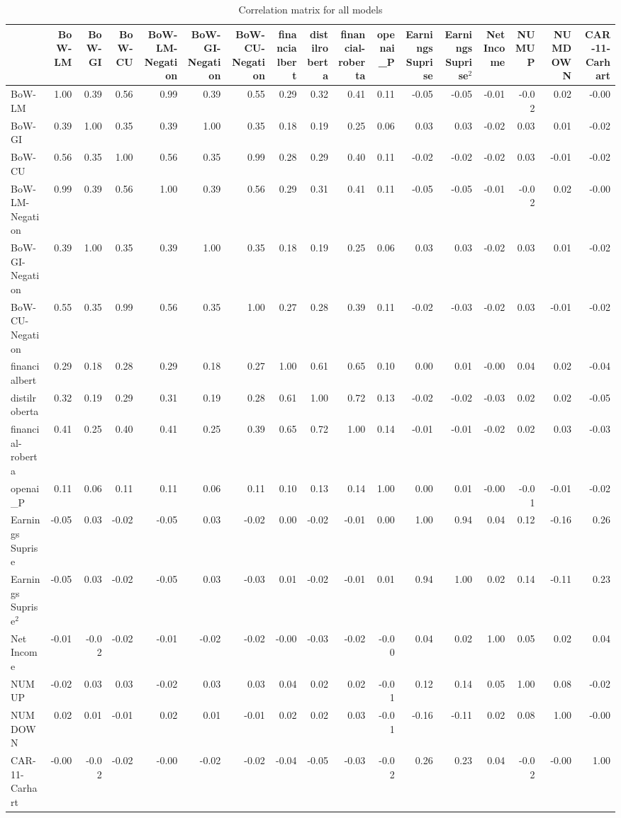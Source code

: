 \begin{table}
\caption{Correlation matrix for all models}
\label{tab:all_models_corr}
\begin{tabular}{lrrrrrrrrrrrrrrrr}
\toprule
 & BoW-LM & BoW-GI & BoW-CU & BoW-LM-Negation & BoW-GI-Negation & BoW-CU-Negation & financialbert & distilroberta & financial-roberta & openai_P & Earnings Suprise & Earnings Suprise$^2$ & Net Income & NUMUP & NUMDOWN & CAR-11-Carhart \\
\midrule
BoW-LM & 1.00 & 0.39 & 0.56 & 0.99 & 0.39 & 0.55 & 0.29 & 0.32 & 0.41 & 0.11 & -0.05 & -0.05 & -0.01 & -0.02 & 0.02 & -0.00 \\
BoW-GI & 0.39 & 1.00 & 0.35 & 0.39 & 1.00 & 0.35 & 0.18 & 0.19 & 0.25 & 0.06 & 0.03 & 0.03 & -0.02 & 0.03 & 0.01 & -0.02 \\
BoW-CU & 0.56 & 0.35 & 1.00 & 0.56 & 0.35 & 0.99 & 0.28 & 0.29 & 0.40 & 0.11 & -0.02 & -0.02 & -0.02 & 0.03 & -0.01 & -0.02 \\
BoW-LM-Negation & 0.99 & 0.39 & 0.56 & 1.00 & 0.39 & 0.56 & 0.29 & 0.31 & 0.41 & 0.11 & -0.05 & -0.05 & -0.01 & -0.02 & 0.02 & -0.00 \\
BoW-GI-Negation & 0.39 & 1.00 & 0.35 & 0.39 & 1.00 & 0.35 & 0.18 & 0.19 & 0.25 & 0.06 & 0.03 & 0.03 & -0.02 & 0.03 & 0.01 & -0.02 \\
BoW-CU-Negation & 0.55 & 0.35 & 0.99 & 0.56 & 0.35 & 1.00 & 0.27 & 0.28 & 0.39 & 0.11 & -0.02 & -0.03 & -0.02 & 0.03 & -0.01 & -0.02 \\
financialbert & 0.29 & 0.18 & 0.28 & 0.29 & 0.18 & 0.27 & 1.00 & 0.61 & 0.65 & 0.10 & 0.00 & 0.01 & -0.00 & 0.04 & 0.02 & -0.04 \\
distilroberta & 0.32 & 0.19 & 0.29 & 0.31 & 0.19 & 0.28 & 0.61 & 1.00 & 0.72 & 0.13 & -0.02 & -0.02 & -0.03 & 0.02 & 0.02 & -0.05 \\
financial-roberta & 0.41 & 0.25 & 0.40 & 0.41 & 0.25 & 0.39 & 0.65 & 0.72 & 1.00 & 0.14 & -0.01 & -0.01 & -0.02 & 0.02 & 0.03 & -0.03 \\
openai_P & 0.11 & 0.06 & 0.11 & 0.11 & 0.06 & 0.11 & 0.10 & 0.13 & 0.14 & 1.00 & 0.00 & 0.01 & -0.00 & -0.01 & -0.01 & -0.02 \\
Earnings Suprise & -0.05 & 0.03 & -0.02 & -0.05 & 0.03 & -0.02 & 0.00 & -0.02 & -0.01 & 0.00 & 1.00 & 0.94 & 0.04 & 0.12 & -0.16 & 0.26 \\
Earnings Suprise$^2$ & -0.05 & 0.03 & -0.02 & -0.05 & 0.03 & -0.03 & 0.01 & -0.02 & -0.01 & 0.01 & 0.94 & 1.00 & 0.02 & 0.14 & -0.11 & 0.23 \\
Net Income & -0.01 & -0.02 & -0.02 & -0.01 & -0.02 & -0.02 & -0.00 & -0.03 & -0.02 & -0.00 & 0.04 & 0.02 & 1.00 & 0.05 & 0.02 & 0.04 \\
NUMUP & -0.02 & 0.03 & 0.03 & -0.02 & 0.03 & 0.03 & 0.04 & 0.02 & 0.02 & -0.01 & 0.12 & 0.14 & 0.05 & 1.00 & 0.08 & -0.02 \\
NUMDOWN & 0.02 & 0.01 & -0.01 & 0.02 & 0.01 & -0.01 & 0.02 & 0.02 & 0.03 & -0.01 & -0.16 & -0.11 & 0.02 & 0.08 & 1.00 & -0.00 \\
CAR-11-Carhart & -0.00 & -0.02 & -0.02 & -0.00 & -0.02 & -0.02 & -0.04 & -0.05 & -0.03 & -0.02 & 0.26 & 0.23 & 0.04 & -0.02 & -0.00 & 1.00 \\
\bottomrule
\end{tabular}
\end{table}
